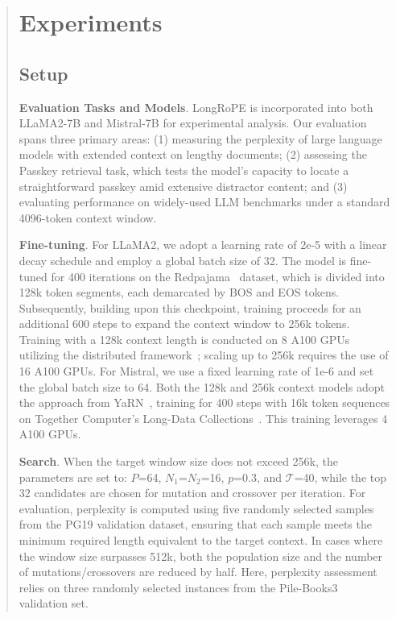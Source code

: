 \begin{abstract}
 \section{Experiments}

\label{sec:exp}
\subsection{Setup}
\textbf{Evaluation Tasks and Models}. LongRoPE is incorporated into both LLaMA2-7B and Mistral-7B for experimental analysis. Our evaluation spans three primary areas: (1) measuring the perplexity of large language models with extended context on lengthy documents; (2) assessing the Passkey retrieval task, which tests the model's capacity to locate a straightforward passkey amid extensive distractor content; and (3) evaluating performance on widely-used LLM benchmarks under a standard 4096-token context window.

\textbf{Fine-tuning}. For LLaMA2, we adopt a learning rate of 2e-5 with a linear decay schedule and employ a global batch size of 32. The model is fine-tuned for 400 iterations on the Redpajama~\cite{redpajama} dataset, which is divided into 128k token segments, each demarcated by BOS and EOS tokens. Subsequently, building upon this checkpoint, training proceeds for an additional 600 steps to expand the context window to 256k tokens. Training with a 128k context length is conducted on 8 A100 GPUs utilizing the distributed framework~\cite{cube}; scaling up to 256k requires the use of 16 A100 GPUs. For Mistral, we use a fixed learning rate of 1e-6 and set the global batch size to 64. Both the 128k and 256k context models adopt the approach from YaRN~\cite{yarn}, training for 400 steps with 16k token sequences on Together Computer's Long-Data Collections~\cite{mistraldata}. This training leverages 4 A100 GPUs.

\textbf{Search}. When the target window size does not exceed 256k, the parameters are set to: $P$=64, $N_1$=$N_2$=16, $p$=0.3, and $\mathcal{T}$=40, while the top 32 candidates are chosen for mutation and crossover per iteration. For evaluation, perplexity is computed using five randomly selected samples from the PG19 validation dataset, ensuring that each sample meets the minimum required length equivalent to the target context. In cases where the window size surpasses 512k, both the population size and the number of mutations/crossovers are reduced by half. Here, perplexity assessment relies on three randomly selected instances from the Pile-Books3~\cite{pile} validation set.


\end{abstract}
